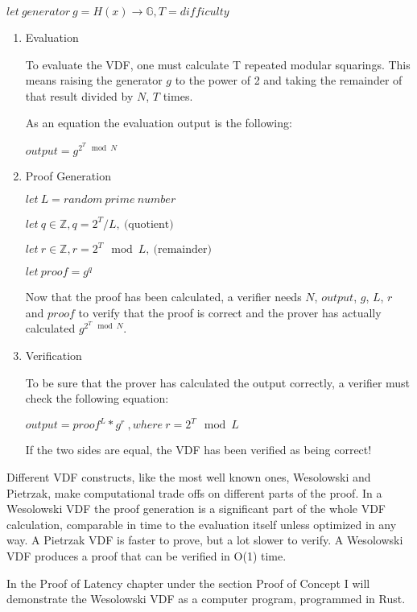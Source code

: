 \( let \: generator \: g = H(x) \to \mathbb{G}, T = difficulty \)
\begin{enumerate}
	\item{Evaluation}
																	
	To evaluate the VDF, one must calculate T repeated modular squarings. This means raising the generator $g$ to the power of 2 and taking the remainder of that result divided by $N$, $T$ times.
																	
	As an equation the evaluation output is the following:
																	
	\( output = g^{2^{T} \mod N } \) 
																	
	\item{Proof Generation}
																	
	\( let \: L = random \: prime \: number \)
																	
	\( let \: q \in \mathbb{Z}, q = 2^T/L, \: \text{(quotient)} \)
																	
	\( let \: r \in \mathbb{Z}, r = 2^T\mod L, \: \text{(remainder)} \)
																	
	\( let \: proof = g^q \) 
																	
	Now that the proof has been calculated, a verifier needs $N$, $output$, $g$, $L$, $r$ and $proof$ to verify that the proof is correct and the prover has actually calculated $g^{2^{T} \mod N }$.
																	
	\item{Verification}
																	
	To be sure that the prover has calculated the output correctly, a verifier must check the following equation:
																	
	\( output = proof^L * g^r \:, where \: r = 2^T \mod L \)
																	
	If the two sides are equal, the VDF has been verified as being correct!
\end{enumerate}

Different VDF constructs, like the most well known ones, Wesolowski and Pietrzak, make computational trade offs on different parts of the proof. In a Wesolowski VDF the proof generation is a significant part of the whole VDF calculation, comparable in time to the evaluation itself unless optimized in any way. A Pietrzak VDF is faster to prove, but a lot slower to verify. A Wesolowski VDF produces a proof that can be verified in O(1) time.

In the Proof of Latency chapter under the section Proof of Concept I will demonstrate the Wesolowski VDF as a computer program, programmed in Rust.

